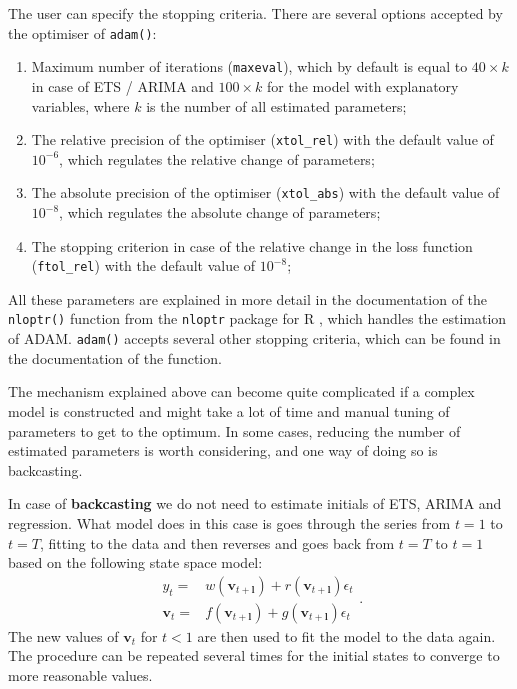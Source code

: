 \documentclass[]{book}
\providecommand{\tightlist}{%
  \setlength{\itemsep}{0pt}\setlength{\parskip}{0pt}}
\theoremstyle{definition}
\theoremstyle{definition}
\theoremstyle{definition}
\theoremstyle{definition}
\theoremstyle{remark}
\begin{document}
The user can specify the stopping criteria. There are several options accepted by the optimiser of \texttt{adam()}:

\begin{enumerate}
\def\labelenumi{\arabic{enumi}.}
\tightlist
\item
  Maximum number of iterations (\texttt{maxeval}), which by default is equal to \(40\times k\) in case of ETS / ARIMA and \(100 \times k\) for the model with explanatory variables, where \(k\) is the number of all estimated parameters;
\item
  The relative precision of the optimiser (\texttt{xtol\_rel}) with the default value of \(10^{-6}\), which regulates the relative change of parameters;
\item
  The absolute precision of the optimiser (\texttt{xtol\_abs}) with the default value of \(10^{-8}\), which regulates the absolute change of parameters;
\item
  The stopping criterion in case of the relative change in the loss function (\texttt{ftol\_rel}) with the default value of \(10^{-8}\);
\end{enumerate}

All these parameters are explained in more detail in the documentation of the \texttt{nloptr()} function from the \texttt{nloptr} package for R \citep{nlopt}, which handles the estimation of ADAM. \texttt{adam()} accepts several other stopping criteria, which can be found in the documentation of the function.

The mechanism explained above can become quite complicated if a complex model is constructed and might take a lot of time and manual tuning of parameters to get to the optimum. In some cases, reducing the number of estimated parameters is worth considering, and one way of doing so is backcasting.

In case of \textbf{backcasting} we do not need to estimate initials of ETS, ARIMA and regression. What model does in this case is goes through the series from \(t=1\) to \(t=T\), fitting to the data and then reverses and goes back from \(t=T\) to \(t=1\) based on the following state space model:
\begin{equation}
  \begin{aligned}
  {y}_{t} = &w(\mathbf{v}_{t+\boldsymbol{l}}) + r(\mathbf{v}_{t+\mathbf{l}}) \epsilon_t \\
  \mathbf{v}_{t} = &f(\mathbf{v}_{t+\mathbf{l}}) + g(\mathbf{v}_{t+\mathbf{l}}) \epsilon_t
  \end{aligned}.
  \label{eq:ETSADAMStateSpaceBackwards}
\end{equation}
The new values of \(\mathbf{v}_t\) for \(t<1\) are then used to fit the model to the data again. The procedure can be repeated several times for the initial states to converge to more reasonable values.
\end{document}
